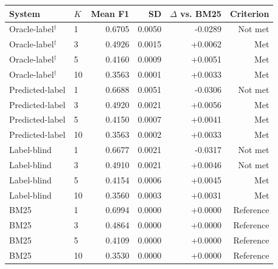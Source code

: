 \begin{tabular}{llrrrr}
\toprule
System & $K$ & Mean F1 & SD & $\Delta$ vs. BM25 & Criterion \\
\midrule
Oracle-label$^{\dagger}$ & 1 & 0.6705 & 0.0050 & -0.0289 & Not met \\
Oracle-label$^{\dagger}$ & 3 & 0.4926 & 0.0015 & +0.0062 & Met \\
Oracle-label$^{\dagger}$ & 5 & 0.4160 & 0.0009 & +0.0051 & Met \\
Oracle-label$^{\dagger}$ & 10 & 0.3563 & 0.0001 & +0.0033 & Met \\
Predicted-label & 1 & 0.6688 & 0.0051 & -0.0306 & Not met \\
Predicted-label & 3 & 0.4920 & 0.0021 & +0.0056 & Met \\
Predicted-label & 5 & 0.4150 & 0.0007 & +0.0041 & Met \\
Predicted-label & 10 & 0.3563 & 0.0002 & +0.0033 & Met \\
Label-blind & 1 & 0.6677 & 0.0021 & -0.0317 & Not met \\
Label-blind & 3 & 0.4910 & 0.0021 & +0.0046 & Not met \\
Label-blind & 5 & 0.4154 & 0.0006 & +0.0045 & Met \\
Label-blind & 10 & 0.3560 & 0.0003 & +0.0031 & Met \\
BM25 & 1 & 0.6994 & 0.0000 & +0.0000 & Reference \\
BM25 & 3 & 0.4864 & 0.0000 & +0.0000 & Reference \\
BM25 & 5 & 0.4109 & 0.0000 & +0.0000 & Reference \\
BM25 & 10 & 0.3530 & 0.0000 & +0.0000 & Reference \\
\bottomrule
\end{tabular}
